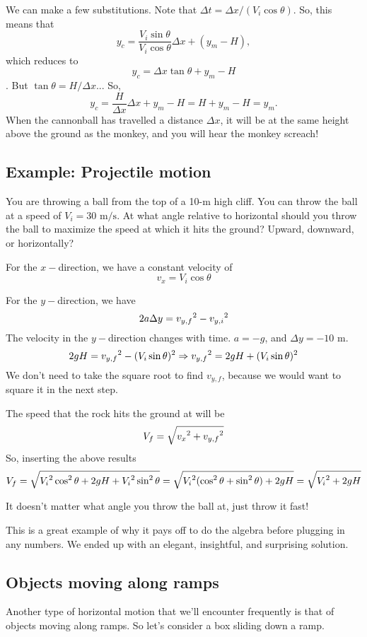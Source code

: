 We can make a few substitutions. Note that $\Delta{t}=\Delta{x}/(V_i\cos\theta)$. So, this means that
$$y_c=\frac{V_i\sin\theta}{V_i\cos\theta}\Delta{x}+(y_m-H),$$
which reduces to
$$y_c=\Delta{x}\tan\theta+y_m-H$$.
But $\tan\theta=H/\Delta{x}$... So,
$$y_c=\frac{H}{\Delta{x}}\Delta{x}+y_m-H=H+y_m-H=y_m.$$
When the cannonball has travelled a distance $\Delta{x}$, it will be at the same height above the ground as the monkey, and you will hear the monkey screach!

\subsection{Example: Projectile motion}
You are throwing a ball from the top of a 10-m high cliff. You can throw the ball at a speed of $V_i=30\mbox{ m/s}$. At what angle relative to horizontal should you throw the ball to maximize the speed at which it hits the ground? Upward, downward, or horizontally?

For the $x-$direction, we have a constant velocity of
$$v_x=V_i\cos\theta$$

For the $y-$direction, we have
$$2a\Delta{y}=v_{y,f}\displaystyle^2-v_{y,i}\displaystyle^2$$
The velocity in the $y-$direction changes with time. $a=-g$, and $\Delta{y}=-10\mbox{ m}$.
$$2gH=v_{y,f}\displaystyle^2-(V_i\sin\theta)\displaystyle^2\Rightarrow v_{y,f}\displaystyle^2=2gH+(V_i\sin\theta)\displaystyle^2$$
We don't need to take the square root to find $v_{y,f}$, because we would want to square it in the next step.

The speed that the rock hits the ground at will be
$$V_f=\sqrt{v_x\displaystyle^2+v_{y,f}\displaystyle^2}$$
So, inserting the above results
$$V_f=\sqrt{V_i\displaystyle^2\cos^2\theta+2gH+V_i\displaystyle^2\sin^2\theta}=\sqrt{V_i\displaystyle^2(\cos^2\theta+\sin^2\theta)+2gH} = \sqrt{V_i\displaystyle^2+2gH}$$

It doesn't matter what angle you throw the ball at, just throw it fast!

This is a great example of why it pays off to do the algebra before plugging in any numbers. We ended up with an elegant, insightful, and surprising solution.

\subsection{Objects moving along ramps}
Another type of horizontal motion that we'll encounter frequently is that of objects moving along ramps. So let's consider a box sliding down a ramp.

\vspace{4cm}


